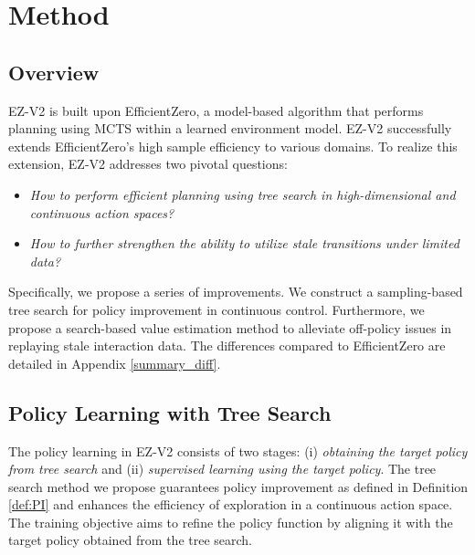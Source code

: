 

\section{Method}

\subsection{Overview}
% 
EZ-V2 is built upon EfficientZero, a model-based algorithm that performs planning using MCTS within a learned environment model. EZ-V2 successfully extends EfficientZero's high sample efficiency to various domains. To realize this extension, EZ-V2 addresses two pivotal questions:
\begin{itemize}
\item \textit{How to perform efficient planning using tree search in high-dimensional and continuous action spaces?}
\item \textit{How to further strengthen the ability to utilize stale transitions under limited data?}
\end{itemize}
Specifically, we propose a series of improvements. We construct a sampling-based tree search for policy improvement in continuous control. Furthermore, we propose a search-based value estimation method to alleviate off-policy issues in replaying stale interaction data. The differences compared to EfficientZero are detailed in Appendix \ref{summary_diff}.




\subsection{Policy Learning with Tree Search} 


The policy learning in EZ-V2 consists of two stages: (i) \textit{obtaining the target policy from tree search} and (ii) \textit{supervised learning using the target policy}. The tree search method we propose guarantees policy improvement as defined in Definition \ref{def:PI} and enhances the efficiency of exploration in a continuous action space. The training objective aims to refine the policy function by aligning it with the target policy obtained from the tree search.


